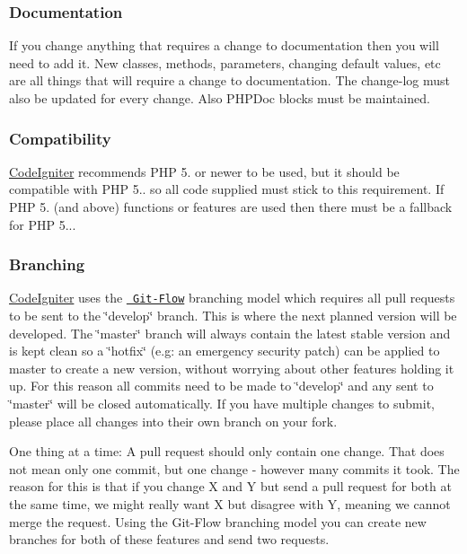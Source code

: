 \subsubsection*{Documentation}

If you change anything that requires a change to documentation then you will need to add it. New classes, methods, parameters, changing default values, etc are all things that will require a change to documentation. The change-\/log must also be updated for every change. Also P\+H\+P\+Doc blocks must be maintained.

\subsubsection*{Compatibility}

\mbox{\hyperlink{a00009}{Code\+Igniter}} recommends P\+HP 5. or newer to be used, but it should be compatible with P\+HP 5.. so all code supplied must stick to this requirement. If P\+HP 5. (and above) functions or features are used then there must be a fallback for P\+HP 5...

\subsubsection*{Branching}

\mbox{\hyperlink{a00009}{Code\+Igniter}} uses the \href{http://nvie.com/posts/a-successful-git-branching-model/}{\texttt{ Git-\/\+Flow}} branching model which requires all pull requests to be sent to the \char`\"{}develop\char`\"{} branch. This is where the next planned version will be developed. The \char`\"{}master\char`\"{} branch will always contain the latest stable version and is kept clean so a \char`\"{}hotfix\char`\"{} (e.\+g\+: an emergency security patch) can be applied to master to create a new version, without worrying about other features holding it up. For this reason all commits need to be made to \char`\"{}develop\char`\"{} and any sent to \char`\"{}master\char`\"{} will be closed automatically. If you have multiple changes to submit, please place all changes into their own branch on your fork.

One thing at a time\+: A pull request should only contain one change. That does not mean only one commit, but one change -\/ however many commits it took. The reason for this is that if you change X and Y but send a pull request for both at the same time, we might really want X but disagree with Y, meaning we cannot merge the request. Using the Git-\/\+Flow branching model you can create new branches for both of these features and send two requests.


